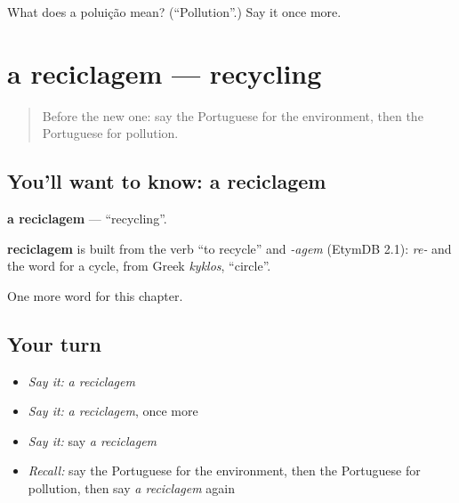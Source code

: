 \begin{tcolorbox}[breakable,colback=teal!4,colframe=teal!35!black,title={Before you move on}]
What does a poluição mean? (\textquotedblleft{}Pollution\textquotedblright{}.) Say it once more.
\end{tcolorbox}
\section[a reciclagem]{a reciclagem — recycling}

\label{lesson:PT-C225-reciclagem}



\begin{quote}
Before the new one: say the Portuguese for the environment, then the Portuguese for pollution.
\end{quote}

\subsection*{You'll want to know: a reciclagem}
\textbf{a reciclagem} — \textquotedblleft{}recycling\textquotedblright{}.

\begin{cousinweb}
\textbf{reciclagem} is built from the verb \textquotedblleft{}to recycle\textquotedblright{} and \emph{-agem} (EtymDB 2.1): \emph{re-} and the word for a cycle, from Greek \emph{kyklos}, \textquotedblleft{}circle\textquotedblright{}.
\end{cousinweb}

\begin{grammarlens}[title={What you've built}]
One more word for this chapter.
\end{grammarlens}

\subsection*{Your turn}
\begin{itemize}
\raggedright
  \item \emph{Say it:} \emph{a reciclagem}
  \item \emph{Say it:} \emph{a reciclagem}, once more
  \item \emph{Say it:} say \emph{a reciclagem}
  \item \emph{Recall:} say the Portuguese for the environment, then the Portuguese for pollution, then say \emph{a reciclagem} again
\end{itemize}

